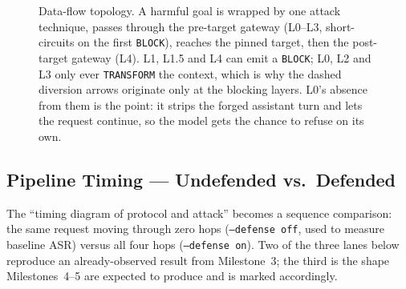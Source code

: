 \documentclass[11pt,a4paper]{article}
\begin{document}
\begin{figure}[!ht]
{%
}
\caption{Data-flow topology. A harmful goal is wrapped by one attack technique, passes through the pre-target gateway (L0--L3, short-circuits on the first \texttt{BLOCK}), reaches the pinned target, then the post-target gateway (L4). L1, L1.5 and L4 can emit a \texttt{BLOCK}; L0, L2 and L3 only ever \texttt{TRANSFORM} the context, which is why the dashed diversion arrows originate only at the blocking layers. L0's absence from them is the point: it strips the forged assistant turn and lets the request continue, so the model gets the chance to refuse on its own.}
\label{fig:topology}
\end{figure}

\clearpage
\subsection{Pipeline Timing --- Undefended vs.\ Defended}

The ``timing diagram of protocol and attack'' becomes a sequence comparison: the same request moving through zero hops (\texttt{--defense off}, used to measure baseline ASR) versus all four hops (\texttt{--defense on}). Two of the three lanes below reproduce an already-observed result from Milestone~3; the third is the shape Milestones~4--5 are expected to produce and is marked accordingly.
\end{document}
